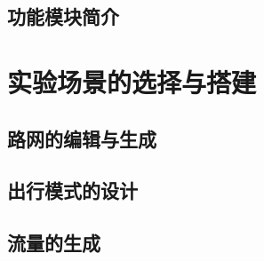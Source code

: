 \subsection{功能模块简介}

\section{实验场景的选择与搭建}

\subsection{路网的编辑与生成}

\subsection{出行模式的设计}

\subsection{流量的生成}